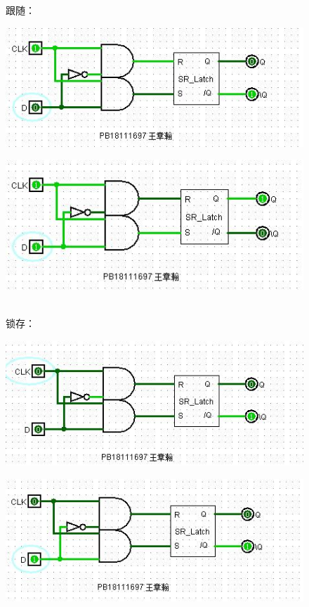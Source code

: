 \documentclass[UTF8]{article}
\begin{document}
	\begin{figure}[H]
		跟随：
		\begin{minipage}[H]{0.49\linewidth}
			\centering
			\includegraphics[width=1\linewidth]{D_Latch_Follow_0.jpg}
			\label{D_Latch_Follow_0}
		\end{minipage}
		\begin{minipage}[H]{0.49\linewidth}
			\centering
			\includegraphics[width=1\linewidth]{D_Latch_Follow_1.jpg}
			\label{D_Latch_Follow_1}
		\end{minipage}\\
		锁存：
		\begin{minipage}[H]{0.49\linewidth}
			\centering
			\includegraphics[width=1\linewidth]{D_Latch_Lock_0.jpg}
			\label{D_Latch_Lock_0}
		\end{minipage}
		\begin{minipage}[H]{0.49\linewidth}
			\centering
			\includegraphics[width=1\linewidth]{D_Latch_Lock_1.jpg}

\end{minipage}
\end{figure}
\end{document}

